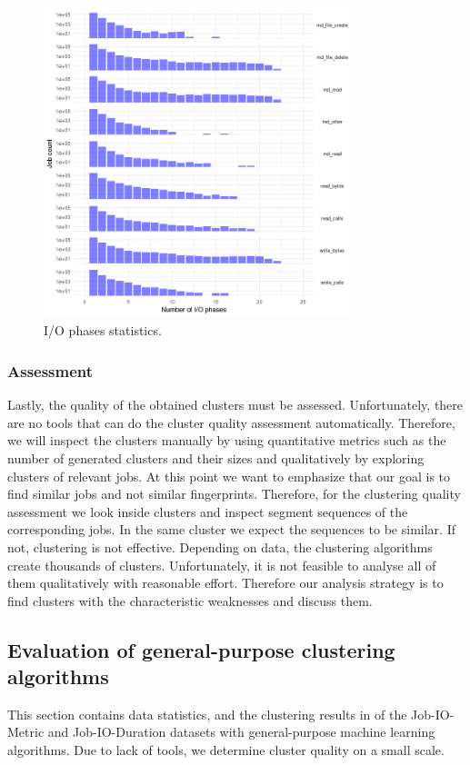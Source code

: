 \documentclass[]{llncs}
\begin{document}
\begin{figure}
  \centering
  \includegraphics[width=3.55in,height=3.56in]{./media/image23.png}
  \caption{I/O phases statistics.}
  \label{fig:phases_stats}
\end{figure}


\subsubsection{Assessment}
Lastly, the quality of the obtained clusters must be assessed.
Unfortunately, there are no tools that can do the cluster quality assessment automatically.
Therefore, we will inspect the clusters manually by using quantitative metrics such as the number of generated clusters and their sizes and qualitatively by exploring clusters of relevant jobs.
At this point we want to emphasize that our goal is to find similar jobs and not similar fingerprints.
Therefore, for the clustering quality assessment we look inside clusters and inspect segment sequences of the corresponding jobs.
In the same cluster we expect the sequences to be similar.
If not, clustering is not effective.
Depending on data, the clustering algorithms create thousands of clusters.
Unfortunately, it is not feasible to analyse all of them qualitatively with reasonable effort.
Therefore our analysis strategy is to find clusters with the characteristic weaknesses and discuss them.


\subsection{Evaluation of general-purpose clustering algorithms}
This section contains data statistics, and the clustering results in  of the Job-IO-Metric and Job-IO-Duration datasets with general-purpose machine learning algorithms.
Due to lack of tools, we determine cluster quality on a small scale.
\end{document}
